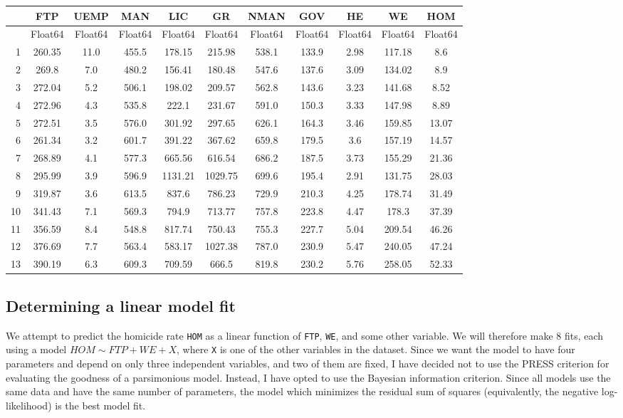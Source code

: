 \documentclass[12pt,a4paper]{article}
\begin{document}
\begin{tabular}{r|cccccccccc}
	& FTP & UEMP & MAN & LIC & GR & NMAN & GOV & HE & WE & HOM\\
	\hline
	& Float64 & Float64 & Float64 & Float64 & Float64 & Float64 & Float64 & Float64 & Float64 & Float64\\
	\hline
	1 & 260.35 & 11.0 & 455.5 & 178.15 & 215.98 & 538.1 & 133.9 & 2.98 & 117.18 & 8.6 \\
	2 & 269.8 & 7.0 & 480.2 & 156.41 & 180.48 & 547.6 & 137.6 & 3.09 & 134.02 & 8.9 \\
	3 & 272.04 & 5.2 & 506.1 & 198.02 & 209.57 & 562.8 & 143.6 & 3.23 & 141.68 & 8.52 \\
	4 & 272.96 & 4.3 & 535.8 & 222.1 & 231.67 & 591.0 & 150.3 & 3.33 & 147.98 & 8.89 \\
	5 & 272.51 & 3.5 & 576.0 & 301.92 & 297.65 & 626.1 & 164.3 & 3.46 & 159.85 & 13.07 \\
	6 & 261.34 & 3.2 & 601.7 & 391.22 & 367.62 & 659.8 & 179.5 & 3.6 & 157.19 & 14.57 \\
	7 & 268.89 & 4.1 & 577.3 & 665.56 & 616.54 & 686.2 & 187.5 & 3.73 & 155.29 & 21.36 \\
	8 & 295.99 & 3.9 & 596.9 & 1131.21 & 1029.75 & 699.6 & 195.4 & 2.91 & 131.75 & 28.03 \\
	9 & 319.87 & 3.6 & 613.5 & 837.6 & 786.23 & 729.9 & 210.3 & 4.25 & 178.74 & 31.49 \\
	10 & 341.43 & 7.1 & 569.3 & 794.9 & 713.77 & 757.8 & 223.8 & 4.47 & 178.3 & 37.39 \\
	11 & 356.59 & 8.4 & 548.8 & 817.74 & 750.43 & 755.3 & 227.7 & 5.04 & 209.54 & 46.26 \\
	12 & 376.69 & 7.7 & 563.4 & 583.17 & 1027.38 & 787.0 & 230.9 & 5.47 & 240.05 & 47.24 \\
	13 & 390.19 & 6.3 & 609.3 & 709.59 & 666.5 & 819.8 & 230.2 & 5.76 & 258.05 & 52.33 \\
\end{tabular}


\subsection{Determining a linear model fit}
We attempt to predict the homicide rate \texttt{HOM} as a linear function of \texttt{FTP}, \texttt{WE}, and some other variable. We will therefore make 8 fits, each using a model $HOM \sim FTP + WE + X$, where \texttt{X} is one of the other variables in the dataset. Since we want the model to have four parameters and depend on only three independent variables, and two of them are fixed, I have decided not to use the PRESS criterion for evaluating the goodness of a parsimonious model. Instead, I have opted to use the Bayesian information criterion. Since all models use the same data and have the same number of parameters, the model which minimizes the residual sum of squares (equivalently, the negative log-likelihood) is the best model fit.
\end{document}
